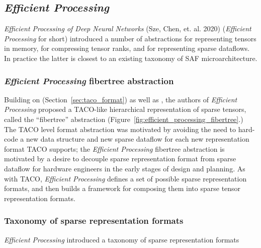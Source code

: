 \subsection{\textit{Efficient Processing}}

\textit{Efficient Processing of Deep Neural Networks}\cite{szebook} (Sze, Chen, et. al. 2020) (\textit{Efficient Processing} for short) introduced a number of abstractions for representing tensors in memory, for compressing tensor ranks, and for representing sparse dataflows. In practice the latter is closest to an existing taxonomy of SAF microarchitecture. 

\subsubsection{\textit{Efficient Processing} fibertree abstraction}

Building on \cite{taco_format} (Section~\ref{sec:taco_format}) as well as \cite{extensor}, the authors of \textit{Efficient Processing} proposed a TACO-like hierarchical representation of sparse tensors, called the ``fibertree'' abstraction (Figure~\ref{fig:efficient_processing_fibertree}.) The TACO level format abstraction was motivated by avoiding the need to hard-code a new data structure and new sparse dataflow for each new representation format TACO supports\cite{taco_format}; the \textit{Efficient Processing} fibertree abstraction is motivated by a desire to decouple sparse representation format from sparse dataflow for hardware engineers in the early stages of design and planning\cite{szebook}. As with TACO\cite{taco_format}, \textit{Efficient Processing} defines a set of possible sparse representation formats, and then builds a framework for composing them into sparse tensor representation formats.

\subsubsection{Taxonomy of sparse representation formats}

\textit{Efficient Processing} introduced a taxonomy of sparse representation formats 


